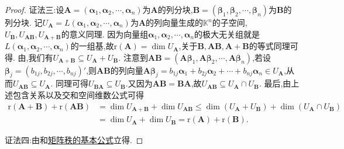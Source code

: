 \documentclass[../../main.tex]{subfiles}%
\begin{document}
\begin{proof}
{\color{blue}证法三:}设\(\boldsymbol{A}=(\boldsymbol{\alpha}_1,\boldsymbol{\alpha}_2,\cdots,\boldsymbol{\alpha}_n)\)为\(\boldsymbol{A}\)的列分块,\(\boldsymbol{B}=(\boldsymbol{\beta}_1,\boldsymbol{\beta}_2,\cdots,\boldsymbol{\beta}_n)\)为\(\boldsymbol{B}\)的列分块. 记\(U_{\boldsymbol{A}} = L(\boldsymbol{\alpha}_1,\boldsymbol{\alpha}_2,\cdots,\boldsymbol{\alpha}_n)\)为\(\boldsymbol{A}\)的列向量生成的\(\mathbb{K}^n\)的子空间,\(U_{\boldsymbol{B}},U_{\boldsymbol{A}\boldsymbol{B}},U_{\boldsymbol{A}+\boldsymbol{B}}\)的意义同理. 因为向量组\(\boldsymbol{\alpha}_1,\boldsymbol{\alpha}_2,\cdots,\boldsymbol{\alpha}_n\)的极大无关组就是\(L(\boldsymbol{\alpha}_1,\boldsymbol{\alpha}_2,\cdots,\boldsymbol{\alpha}_n)\)的一组基,故\(\mathrm{r}(\boldsymbol{A})=\dim U_{\boldsymbol{A}}\),关于\(\boldsymbol{B},\boldsymbol{A}\boldsymbol{B},\boldsymbol{A}+\boldsymbol{B}\)的等式同理可得. 由,我们有\(U_{\boldsymbol{A}+\boldsymbol{B}}\subseteq U_{\boldsymbol{A}}+U_{\boldsymbol{B}}\). 注意到\(\boldsymbol{A}\boldsymbol{B}=(\boldsymbol{A}\boldsymbol{\beta}_1,\boldsymbol{A}\boldsymbol{\beta}_2,\cdots,\boldsymbol{A}\boldsymbol{\beta}_n)\),若设\(\boldsymbol{\beta}_j=(b_{1j},b_{2j},\cdots,b_{nj})'\),则\(\boldsymbol{A}\boldsymbol{B}\)的列向量\(\boldsymbol{A}\boldsymbol{\beta}_j=b_{1j}\boldsymbol{\alpha}_1 + b_{2j}\boldsymbol{\alpha}_2+\cdots + b_{nj}\boldsymbol{\alpha}_n\in U_{\boldsymbol{A}}\),从而\(U_{\boldsymbol{A}\boldsymbol{B}}\subseteq U_{\boldsymbol{A}}\). 同理可得\(U_{\boldsymbol{B}\boldsymbol{A}}\subseteq U_{\boldsymbol{B}}\).又因为\(\boldsymbol{A}\boldsymbol{B}=\boldsymbol{B}\boldsymbol{A}\),故\(U_{\boldsymbol{A}\boldsymbol{B}}\subseteq U_{\boldsymbol{A}}\cap U_{\boldsymbol{B}}\). 最后,由上述包含关系以及交和空间维数公式可得
\begin{align*}
\mathrm{r}(\boldsymbol{A}+\boldsymbol{B})+\mathrm{r}(\boldsymbol{A}\boldsymbol{B})&=\dim U_{\boldsymbol{A}+\boldsymbol{B}}+\dim U_{\boldsymbol{A}\boldsymbol{B}}\leqslant \dim(U_{\boldsymbol{A}}+U_{\boldsymbol{B}})+\dim(U_{\boldsymbol{A}}\cap U_{\boldsymbol{B}})\\
&=\dim U_{\boldsymbol{A}}+\dim U_{\boldsymbol{B}}=\mathrm{r}(\boldsymbol{A})+\mathrm{r}(\boldsymbol{B}).
\end{align*}

{\color{blue}证法四:}由和\hyperref[proposition:矩阵秩的基本公式]{矩阵秩的基本公式}立得.
\end{proof}
\end{document}
